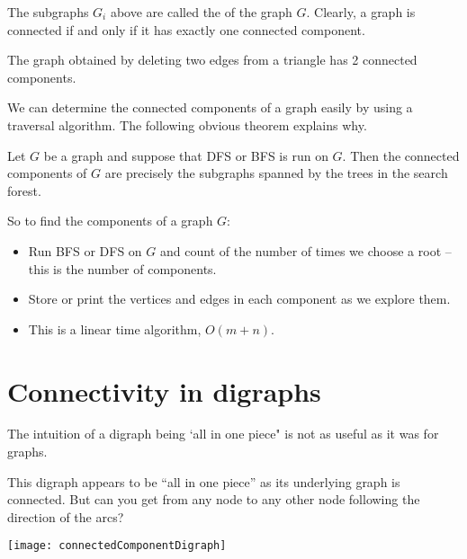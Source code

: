 The subgraphs $G_i$ above are called the 
of the graph $G$. Clearly, a graph is connected if and only if it has
exactly one connected component.

\begin{Boxample} \label{eg:components}
The graph obtained by deleting two edges from a triangle has 2 connected components.
\end{Boxample}

We can determine the connected components of a graph easily by using a
traversal algorithm. The following obvious theorem explains why.

\begin{Theorem} \label{thm:trav-comps}
Let $G$ be a graph and suppose that DFS or BFS is run on $G$. Then the
connected components of $G$ are precisely the subgraphs spanned by the
trees in the search forest. 
\end{Theorem}


So to find the components of a graph $G$:
\begin{itemize}
\item Run BFS or DFS on $G$ and count of the number of times we choose a root -- this is the number of components.
\item Store or print the vertices and edges in each component as we explore them.
\item This is a linear time algorithm, $O(m+n)$.
\end{itemize}

\section{Connectivity in digraphs}

The intuition of a digraph being `all in one piece" is not as useful as it was for graphs. 

\begin{Boxample}[0]
This digraph appears to be ``all in one piece'' as its underlying graph is connected. 
But can you get from any node to any other node following the direction of the arcs?
\begin{center}
\texttt{[image: connectedComponentDigraph]}
\end{center}
\end{Boxample}

